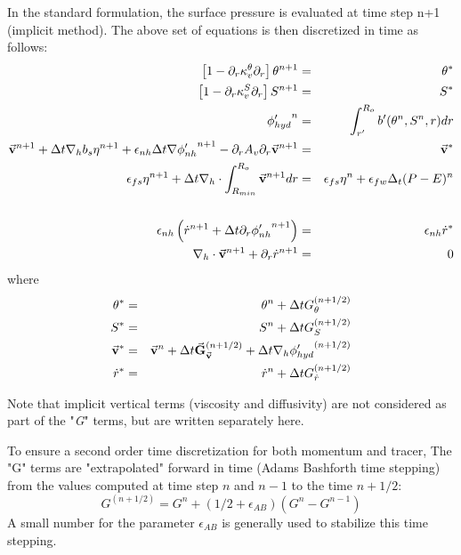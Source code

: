 In the standard formulation, the surface pressure is 
evaluated at time step n+1 (implicit method).
The above set of equations is then discretized in time 
as follows:
\begin{eqnarray}
\left[ 1 - \partial_r \kappa_v^\theta \partial_r \right]
\theta^{n+1} & = & \theta^*
\\
\left[ 1 - \partial_r \kappa_v^S \partial_r \right]
S^{n+1} & = & S^*
\\
{\phi'_{hyd}}^{n} & = & \int_{r'}^{R_o} b'(\theta^{n},S^{n},r) dr
\label{eq-rtd-hyd}
\\
\vec{\bf v} ^{n+1}
+ \Delta t {\bf \nabla}_h b_s {\eta}^{n+1}
+ \epsilon_{nh} \Delta t {\bf \nabla} {\phi'_{nh}}^{n+1}
- \partial_r A_v \partial_r \vec{\bf v}^{n+1}
& = &
\vec{\bf v}^*
\label{eq-rtd-hmom}
\\
\epsilon_{fs} {\eta}^{n+1} + \Delta t
{\bf \nabla}_h \cdot \int_{R_{min}}^{R_o} \vec{\bf v}^{n+1} dr
& = & 
    \epsilon_{fs} {\eta}^{n} + \epsilon_{fw} \Delta_t (P-E)^{n} 
\nonumber
\\
\label{eq-rtd-eta}
\\
\epsilon_{nh} \left( \dot{r} ^{n+1}
+ \Delta t \partial_r {\phi'_{nh}} ^{n+1}
\right)
& = & \epsilon_{nh} \dot{r}^*
\label{eq-rtd-rdot}
\\
{\bf \nabla}_h \cdot \vec{\bf v}^{n+1} + \partial_r \dot{r}^{n+1}
& = & 0
\label{eq-rtd-cont}
\end{eqnarray}
where
\begin{eqnarray}
\theta^* & = &
\theta ^{n} + \Delta t G_{\theta} ^{(n+1/2)}
\\
S^* & = &
S ^{n} + \Delta t G_{S} ^{(n+1/2)}
\\
\vec{\bf v}^* & = &
\vec{\bf v}^{n} + \Delta t \vec{\bf G}_{\vec{\bf v}} ^{(n+1/2)}
+ \Delta t  {\bf \nabla}_h {\phi'_{hyd}}^{(n+1/2)}
\\
\dot{r}^* & = &
\dot{r} ^{n} + \Delta t G_{\dot{r}} ^{(n+1/2)}
\end{eqnarray}

Note that implicit vertical terms (viscosity and diffusivity) are 
not considered as part of the "{\it G}" terms, but are 
written separately here.

To ensure a second order time discretization for both 
momentum and tracer,
The "G" terms are "extrapolated" forward in time
(Adams Bashforth time stepping)
from the values computed at time step $n$ and $n-1$
to the time $n+1/2$:
$$G^{(n+1/2)} = G^n + (1/2+\epsilon_{AB}) (G^n - G^{n-1})$$
A small number for the parameter $\epsilon_{AB}$ is generally used 
to stabilize this time stepping.

